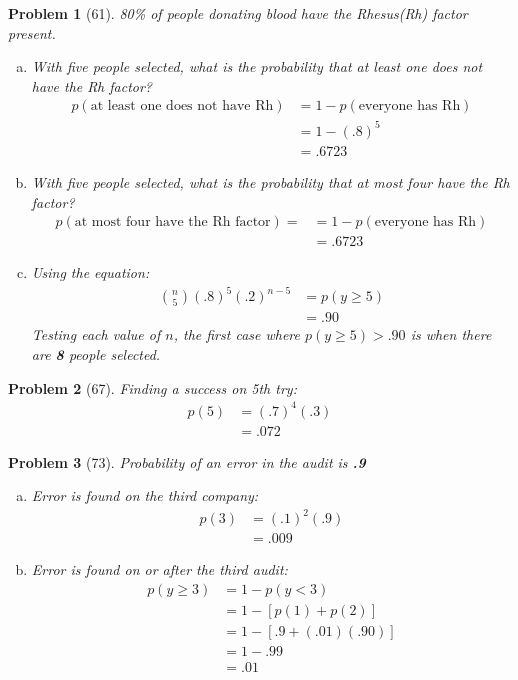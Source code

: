 \documentclass{article}
\theoremstyle{problem}
\newtheorem{prob}{Problem}
\begin{document}
\begin{prob}[61]
  80\% of people donating blood have the Rhesus(Rh) factor present.
  \begin{enumerate}[a)]
  \item With five people selected, what is the probability that at least one does not have the Rh factor?
    \begin{align*}
      p(\text{at least one does not have Rh}) &= 1 - p(\text{everyone has Rh})\\
      &= 1 - (.8)^5\\
      &= .6723
    \end{align*}
  \item With five people selected, what is the probability that at most four have the Rh factor?
    \begin{align*}
      p(\text{at most four have the Rh factor}) = &= 1 - p(\text{everyone has Rh})\\
      &= .6723
    \end{align*}
  \item Using the equation:
    \begin{align*}
    {n \choose 5} (.8)^5 (.2)^{n-5} &= p(y \geq 5)\\
    &= .90
  \end{align*}  
  Testing each value of $n$, the first case where $p(y \geq 5) > .90$ is when there are \textbf{8} people selected.
  \end{enumerate}
\end{prob}
%
\begin{prob}[67] Finding a success on 5th try:
  \begin{align*}
    p(5) &= (.7)^{4}(.3)\\
    &= .072
  \end{align*}
\end{prob}
%
\begin{prob}[73]
  Probability of an error in the audit is \textbf{.9}
  \begin{enumerate}[a)]
  \item Error is found on the third company:
    \begin{align*}
      p(3) &= (.1)^2 (.9)\\
      &= .009
    \end{align*}
  \item Error is found on or after the third audit:
    \begin{align*}
      p(y \geq 3) &= 1 - p(y < 3)\\
      &= 1 - [p(1) + p(2)]\\
      &= 1 - [.9 + (.01)(.90)]\\
      &= 1 - .99\\
      &= .01
    \end{align*}
  \end{enumerate}
\end{prob}
%
\end{document}
